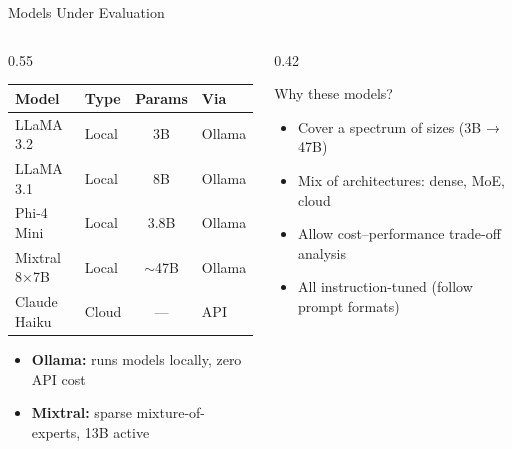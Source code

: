\documentclass[aspectratio=169]{beamer}
\begin{document}
\begin{frame}{Models Under Evaluation}
\begin{columns}[T]
  \begin{column}{0.55\textwidth}
    \begin{tabular}{llcl}
      \toprule
      \textbf{Model} & \textbf{Type} & \textbf{Params} & \textbf{Via}\\
      \midrule
      \rowcolor{palepurple}
      LLaMA 3.2 & Local & 3B & Ollama\\
      LLaMA 3.1 & Local & 8B & Ollama\\
      \rowcolor{palepurple}
      Phi-4 Mini & Local & 3.8B & Ollama\\
      Mixtral 8$\times$7B & Local & $\sim$47B & Ollama\\
      \rowcolor{custompurple!15}
      Claude Haiku & Cloud & --- & API\\
      \bottomrule
    \end{tabular}
    \vspace{0.2cm}
    \begin{itemize}\itemsep4pt\small
      \item \textbf{Ollama:} runs models locally, zero API cost
      \item \textbf{Mixtral:} sparse mixture-of-experts, 13B active
    
    \end{itemize}
  \end{column}
  \begin{column}{0.42\textwidth}
    \begin{block}{Why these models?}
      \begin{itemize}\itemsep5pt\small
        \item Cover a spectrum of sizes (3B → 47B)
        \item Mix of architectures: dense, MoE, cloud
        \item Allow cost--performance trade-off analysis
        \item All instruction-tuned (follow prompt formats)
      \end{itemize}
    \end{block}
    
  \end{column}
\end{columns}
\end{frame}
\end{document}
